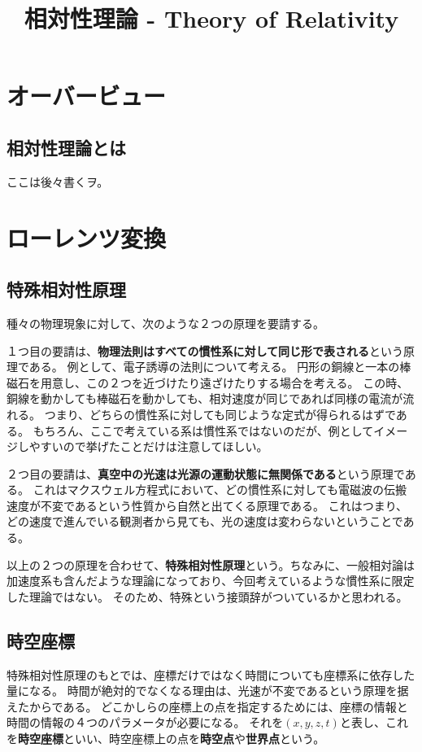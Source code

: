 \documentclass[a4paper]{jsreport}
\title{相対性理論 - Theory of Relativity}
\begin{document}
    \maketitle

    \tableofcontents

    \chapter{オーバービュー}
        \section{相対性理論とは}
            ここは後々書くヲ。

    \chapter{ローレンツ変換}
        \section{特殊相対性原理}
            種々の物理現象に対して、次のような２つの原理を要請する。\par
            １つ目の要請は、\textbf{物理法則はすべての慣性系に対して同じ形で表される}という原理である。
            例として、電子誘導の法則について考える。
            円形の銅線と一本の棒磁石を用意し、この２つを近づけたり遠ざけたりする場合を考える。
            この時、銅線を動かしても棒磁石を動かしても、相対速度が同じであれば同様の電流が流れる。
            つまり、どちらの慣性系に対しても同じような定式が得られるはずである。
            もちろん、ここで考えている系は慣性系ではないのだが、例としてイメージしやすいので挙げたことだけは注意してほしい。\par
            ２つ目の要請は、\textbf{真空中の光速は光源の運動状態に無関係である}という原理である。
            これはマクスウェル方程式において、どの慣性系に対しても電磁波の伝搬速度が不変であるという性質から自然と出てくる原理である。
            これはつまり、どの速度で進んでいる観測者から見ても、光の速度は変わらないということである。\par
            以上の２つの原理を合わせて、\textbf{特殊相対性原理}という。ちなみに、一般相対論は加速度系も含んだような理論になっており、今回考えているような慣性系に限定した理論ではない。
            そのため、特殊という接頭辞がついているかと思われる。
            
        \section{時空座標}
            特殊相対性原理のもとでは、座標だけではなく時間についても座標系に依存した量になる。
            時間が絶対的でなくなる理由は、光速が不変であるという原理を据えたからである。
            どこかしらの座標上の点を指定するためには、座標の情報と時間の情報の４つのパラメータが必要になる。
            それを$(x, y, z, t)$と表し、これを\textbf{時空座標}といい、時空座標上の点を\textbf{時空点}や\textbf{世界点}という。
\end{document}
